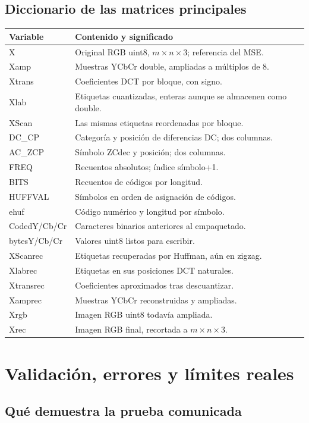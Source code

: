 \documentclass[11pt,a4paper,oneside]{report}
\begin{document}
\section{Diccionario de las matrices principales}

\begin{longtable}{p{}p{}}
\toprule Variable & Contenido y significado\\\midrule\endhead
X & Original RGB uint8, $m\times n\times3$; referencia del MSE.\\
Xamp & Muestras YCbCr double, ampliadas a múltiplos de 8.\\
Xtrans & Coeficientes DCT por bloque, con signo.\\
Xlab & Etiquetas cuantizadas, enteras aunque se almacenen como double.\\
XScan & Las mismas etiquetas reordenadas por bloque.\\
DC\_CP & Categoría y posición de diferencias DC; dos columnas.\\
AC\_ZCP & Símbolo ZCdec y posición; dos columnas.\\
FREQ & Recuentos absolutos; índice símbolo+1.\\
BITS & Recuentos de códigos por longitud.\\
HUFFVAL & Símbolos en orden de asignación de códigos.\\
ehuf & Código numérico y longitud por símbolo.\\
CodedY/Cb/Cr & Caracteres binarios anteriores al empaquetado.\\
bytesY/Cb/Cr & Valores uint8 listos para escribir.\\
XScanrec & Etiquetas recuperadas por Huffman, aún en zigzag.\\
Xlabrec & Etiquetas en sus posiciones DCT naturales.\\
Xtransrec & Coeficientes aproximados tras descuantizar.\\
Xamprec & Muestras YCbCr reconstruidas y ampliadas.\\
Xrgb & Imagen RGB uint8 todavía ampliada.\\
Xrec & Imagen RGB final, recortada a $m\times n\times3$.\\\bottomrule
\end{longtable}


\chapter{Validación, errores y límites reales}
\section{Qué demuestra la prueba comunicada}
\end{document}
